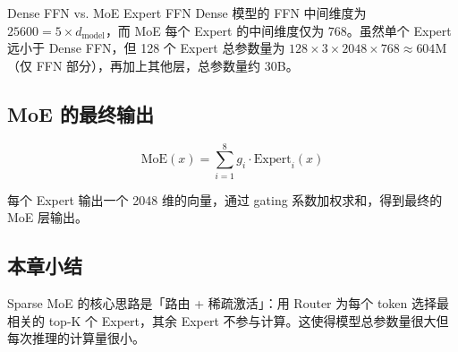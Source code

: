 \begin{knowledgebox}{Dense FFN vs. MoE Expert FFN}
Dense 模型的 FFN 中间维度为 $25600 = 5 \times d_{\text{model}}$，而 MoE 每个 Expert 的中间维度仅为 $768$。虽然单个 Expert 远小于 Dense FFN，但 128 个 Expert 总参数量为 $128 \times 3 \times 2048 \times 768 \approx 604\text{M}$（仅 FFN 部分），再加上其他层，总参数量约 30B。
\end{knowledgebox}

\subsection{MoE 的最终输出}

$$
\text{MoE}(x) = \sum_{i=1}^{8} g_i \cdot \text{Expert}_i(x)
$$

每个 Expert 输出一个 2048 维的向量，通过 gating 系数加权求和，得到最终的 MoE 层输出。

\subsection{本章小结}

Sparse MoE 的核心思路是「路由 + 稀疏激活」：用 Router 为每个 token 选择最相关的 top-K 个 Expert，其余 Expert 不参与计算。这使得模型总参数量很大但每次推理的计算量很小。

